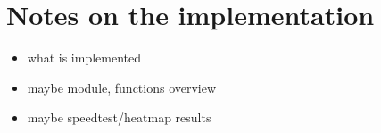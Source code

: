 
\chapter{Notes on the implementation}

\begin{itemize}
	\item what is implemented
	\item maybe module, functions overview
	\item maybe speedtest/heatmap results
\end{itemize}